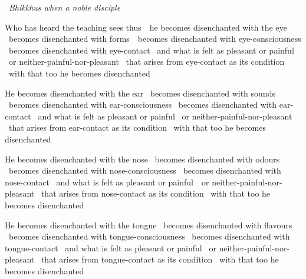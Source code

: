\begin{english-only-leader}
  \anglebracketleft\ \hspace{-0.5mm}\textit{Bhikkhus when a noble disciple} \hspace{-0.5mm}\anglebracketright\
\end{english-only-leader}
\begin{english-only-hang-together}
  Who has heard the teaching sees \mbox{thus}~\breathmark\ he becomes disenchanted with the eye \breathmark\ becomes disenchanted with \mbox{forms}~\breathmark\ becomes disenchanted with eye-consciousness \breathmark\ becomes disenchanted with eye-contact \breathmark\ and what is felt as pleasant or painful \breathmark\ or neither-painful-nor-pleasant \breathmark\ that arises from eye-contact as its condition \breathmark\ with that too he becomes disenchanted
\end{english-only-hang-together}

\begin{english-only-hang}
  He becomes disenchanted with the ear \breathmark\ becomes disenchanted with sounds \breathmark\ becomes disenchanted with ear-consciousness \breathmark\ becomes disenchanted with ear-contact \breathmark\ and what is felt as pleasant or painful \breathmark\ or neither-painful-nor-pleasant \breathmark\ that arises from ear-contact as its condition \breathmark\ with that too he becomes disenchanted
\end{english-only-hang}

\begin{english-only-hang}
  He becomes disenchanted with the nose \breathmark\ becomes disenchanted with odours \breathmark\ becomes disenchanted with nose-consciousness \breathmark\ becomes disenchanted with nose-contact \breathmark\ and what is felt as pleasant or \mbox{painful}~\breathmark\ or neither-painful-nor-pleasant \breathmark\ that arises from nose-contact as its condition \breathmark\ with that too he becomes disenchanted
\end{english-only-hang}

\ifbfive\clearpage\fi
\ifafive\clearpage\fi

\begin{english-only-hang}
  He becomes disenchanted with the tongue \breathmark\ becomes disenchanted with flavours \breathmark\ becomes disenchanted with tongue-consciousness \breathmark\ becomes disenchanted with tongue-contact \breathmark\ and what is felt as pleasant or painful \breathmark\ or neither-painful-nor-pleasant \breathmark\ that arises from tongue-contact as its condition \breathmark\ with that too he becomes disenchanted
\end{english-only-hang}

